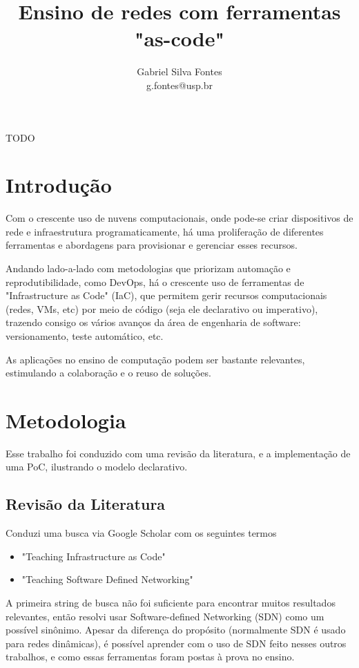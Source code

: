 \documentclass[12pt]{article}
\title{Ensino de redes com ferramentas "as-code"}
\author{Gabriel Silva Fontes\inst{1} \\ g.fontes@usp.br}
\begin{document}
\maketitle

\begin{resumo}
    TODO
\end{resumo}

\section{Introdução}

Com o crescente uso de nuvens computacionais, onde pode-se criar dispositivos
de rede e infraestrutura programaticamente, há uma proliferação de diferentes
ferramentas e abordagens para provisionar e gerenciar esses recursos.

Andando lado-a-lado com metodologias que priorizam automação e
reprodutibilidade, como DevOps, há o crescente uso de ferramentas de
"Infrastructure as Code" (IaC), que permitem gerir recursos computacionais
(redes, VMs, etc) por meio de código (seja ele declarativo ou imperativo),
trazendo consigo os vários avanços da área de engenharia de software:
versionamento, teste automático, etc.

As aplicações no ensino de computação podem ser bastante relevantes,
estimulando a colaboração e o reuso de soluções.

\section{Metodologia}

Esse trabalho foi conduzido com uma revisão da literatura, e a implementação de
uma PoC, ilustrando o modelo declarativo.

\subsection{Revisão da Literatura}

Conduzi uma busca via Google Scholar com os seguintes termos

\begin{itemize}
    \item "Teaching Infrastructure as Code"
    \item "Teaching Software Defined Networking"
\end{itemize}

A primeira string de busca não foi suficiente para encontrar muitos resultados
relevantes, então resolvi usar Software-defined Networking (SDN) como um
possível sinônimo. Apesar da diferença do propósito (normalmente SDN é usado
para redes dinâmicas\cite{vsuh2017designing}), é possível aprender com o uso de
SDN feito nesses outros trabalhos, e como essas ferramentas foram postas à
prova no ensino.
\end{document}
